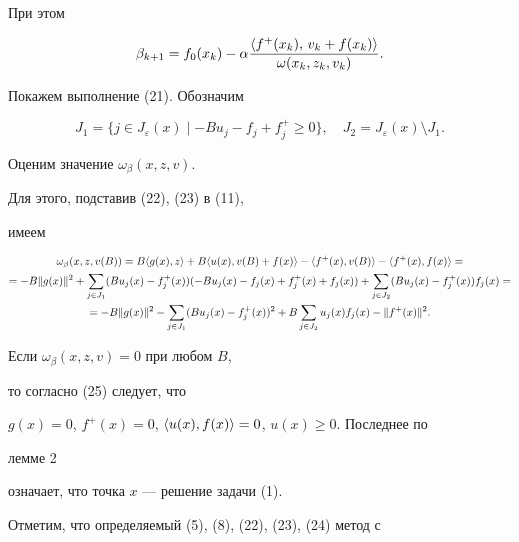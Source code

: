 При этом 


$$ 


\beta_{k+1}=f_0(x_k)-\alpha 


\frac{\la f^+(x_k),\,v_k+f(x_k)\ra} 


{\omega(x_k,z_k,v_k)}. 


$$ 


 


Покажем выполнение (21). Обозначим 


$$ 


J_1=\{j\in J_\varepsilon(x)\mid -B u_j-f_j+f^+_j\ge 0\}, 


\quad J_2=J_\varepsilon(x)\setminus J_1. 


$$ 


Оценим значение $\omega_\beta(x,z,v)$. 


Для этого, подставив (22), (23) в (11), 


имеем 


\begin{multline} 


\omega_\beta(x,z,v(B))=B\la g(x),z\ra+ 


B\la u(x),v(B)+f(x)\ra- \la f^+(x),v(B)\ra- 


\la f^+(x),f(x)\ra= \\ 


=-B\|g(x)\|^2+\sum_{j\in J_1}(B u_j(x)-f^+_j(x)) 


(-B u_j(x)-f_j(x)+f^+_j(x)+f_j(x))+ 


\sum_{j\in J_2}(B u_j(x)-f^+_j(x))f_j(x)= \\ 


=-B\|g(x)\|^2-\sum_{j\in J_1}(B u_j(x)-f^+_j(x))^2+ 


B\sum_{j\in J_2}u_j(x)f_j(x)-\|f^+(x)\|^2. 


\end{multline} 





Если $\omega_\beta(x,z,v)=0$ при любом $B$, 


то согласно (25) следует, что 


$g(x)=0$, $f^+(x)=0$, $\langle u(x),f(x)\rangle=0$, $u(x)\ge 0$. Последнее по 


лемме 2 


означает, что точка $x$ --- решение задачи (1). 


 


Отметим, что определяемый (5), (8), (22), (23), (24) метод с 


